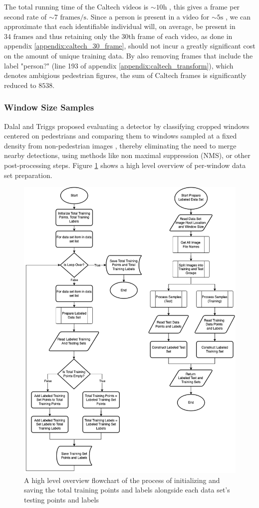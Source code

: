 The total running time of the Caltech videos is $\sim 10\mathrm{h}$ \cite{dollar_2009_pedestrian}, this gives a frame per second rate of $\sim 7 \text{ frames}/\mathrm{s}$. Since a person is present in a video for $\sim 5 \mathrm{s}$ \cite{dollar_2009_pedestrian}, we can approximate that each identifiable individual will, on average, be present in $34 \text{ frames}$ and thus retaining only the $30$th frame of each video, as done in appendix \ref{appendix:caltech_30_frame}, should not incur a greatly significant cost on the amount of unique training data. By also removing frames that include the label "person?" (line 193 of appendix \ref{appendix:caltech_transform}), which denotes ambigious pedestrian figures, the sum of Caltech frames is significantly reduced to $8538$.

\subsubsection{Window Size Samples}

Dalal and Triggs proposed evaluating a detector by classifying cropped windows centered on pedestrians and comparing them to windows sampled at a fixed density from non-pedestrian images \cite{dalal_2005_histograms}, thereby eliminating the need to merge nearby detections, using methods like non maximal suppression (NMS), or other post-processing steps. Figure \ref{fig:dataset_high} shows a high level overview of per-window data set preparation.

\begin{figure}
    \centering
    \includegraphics[width=0.75\linewidth]{images/ee_dataset_high.drawio.png}
    \caption{A high level overview flowchart of the process of initializing and saving the total training points and labels alongside each data set's testing points and labels}
    \label{fig:dataset_high}
\end{figure}

